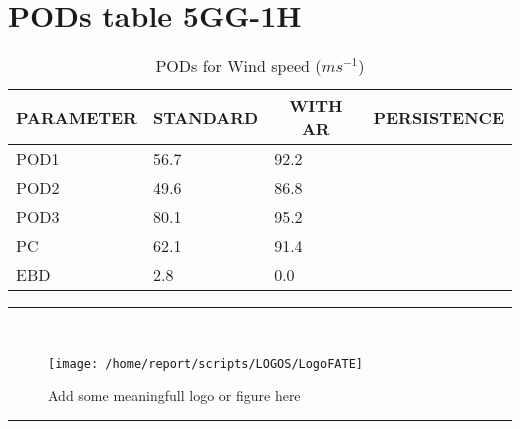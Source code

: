 \documentclass[11pt,english]{article}
\newcommand{\HRule}{\rule{\linewidth}{0.5mm}}
\begin{document}
\section{PODs table 5GG-1H}
\newpage
\begin{table}[]
\begin{center}
\begin{tabular}{|l|l|l|l|}
\hline
\multicolumn{1}{|c|}{\cellcolor[HTML]{C0C0C0}\textbf{PARAMETER}} & \multicolumn{1}{c|}{\cellcolor[HTML]{C0C0C0}\textbf{STANDARD}} & \multicolumn{1}{c|}{\cellcolor[HTML]{C0C0C0}\textbf{WITH AR}} & \multicolumn{1}{c|}{\cellcolor[HTML]{C0C0C0}\textbf{PERSISTENCE}} \\
\hline
\cellcolor[HTML]{C0C0C0}POD1  & 56.7                                & 92.2                                &                                 \\
\cellcolor[HTML]{C0C0C0}POD2  & 49.6                                & 86.8                                &                                 \\
\cellcolor[HTML]{C0C0C0}POD3  & 80.1                                & 95.2                                &                                 \\
\cellcolor[HTML]{C0C0C0}PC    & 62.1                                  & 91.4                                  &                                \\
\cellcolor[HTML]{C0C0C0}EBD   & 2.8                                 & 0.0                                 &                                \\
\hline
\end{tabular}
\caption{PODs for Wind speed ($m s^{-1}$)}
\end{center}
\end{table}

\clearpage
\begin{center}
\HRule \\[0.4cm]
\begin{figure}[htbp]
\centering
{\texttt{[image: /home/report/scripts/LOGOS/LogoFATE]}}
\caption{Add some meaningfull logo or figure here}
\end{figure}
\HRule \\[0.4cm]
\end{center}
\end{document}
